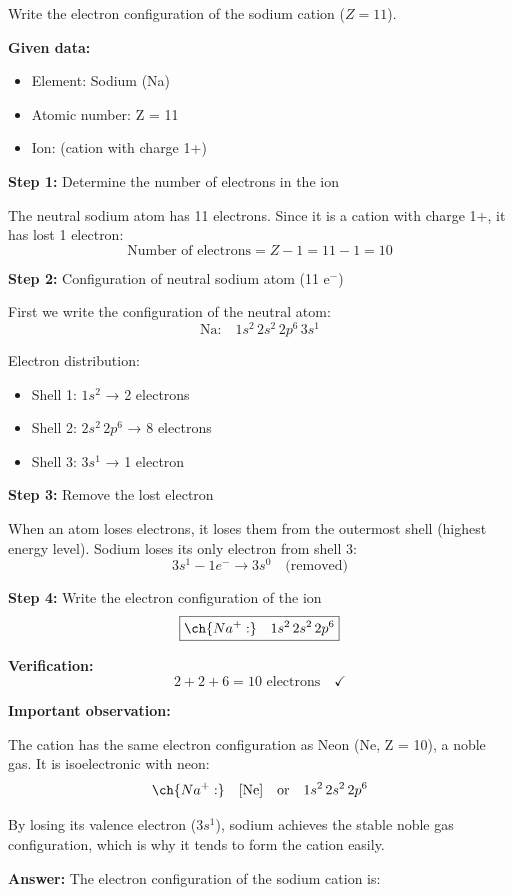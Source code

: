 \begin{exercise}
    Write the electron configuration of the sodium cation  (\( Z = 11 \)).
    \begin{solu}
        \textbf{Given data:}
        \begin{itemize}
            \item Element: Sodium (Na)
            \item Atomic number: Z = 11
            \item Ion:  (cation with charge 1+)
        \end{itemize}

        \textbf{Step 1:} Determine the number of electrons in the ion

        The neutral sodium atom has 11 electrons. Since it is a cation with charge 1+, it has lost 1 electron:
        \[
            \text{Number of electrons} = Z - 1 = 11 - 1 = 10
        \]

        \textbf{Step 2:} Configuration of neutral sodium atom (11 e\(^-\))

        First we write the configuration of the neutral atom:
        \[
            \text{Na:} \quad 1s^2 \, 2s^2 \, 2p^6 \, 3s^1
        \]

        Electron distribution:
        \begin{itemize}
            \item Shell 1: \(1s^2\) → 2 electrons
            \item Shell 2: \(2s^2 \, 2p^6\) → 8 electrons
            \item Shell 3: \(3s^1\) → 1 electron
        \end{itemize}

        \textbf{Step 3:} Remove the lost electron

        When an atom loses electrons, it loses them from the outermost shell (highest energy level). Sodium loses its only electron from shell 3:
        \[
            3s^1 - 1e^- \rightarrow 3s^0 \quad \text{(removed)}
        \]

        \textbf{Step 4:} Write the electron configuration of the ion
        \[
            \boxed{\ch{Na^{+}:} \quad 1s^2 \, 2s^2 \, 2p^6}
        \]

        \textbf{Verification:}
        \[
            2 + 2 + 6 = 10 \text{ electrons} \quad \checkmark
        \]

        \textbf{Important observation:}

        The  cation has the same electron configuration as Neon (Ne, Z = 10), a noble gas. It is isoelectronic with neon:
        \[
            \ch{Na^{+}:} \quad [\text{Ne}] \quad \text{or} \quad 1s^2 \, 2s^2 \, 2p^6
        \]

        By losing its valence electron (\(3s^1\)), sodium achieves the stable noble gas configuration, which is why it tends to form the  cation easily.

        \textbf{Answer:} The electron configuration of the sodium cation is: 
    \end{solu}
\end{exercise}
